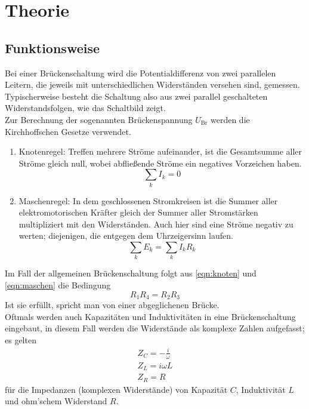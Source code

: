 \section{Theorie}
\label{sec:Theorie}

\subsection{Funktionsweise}
    Bei einer Brückenschaltung wird die Potentialdifferenz von zwei 
    parallelen Leitern, die jeweils mit unterschiedlichen Widerständen 
    versehen sind, gemessen.\\
    Typischerweise besteht die Schaltung also aus zwei parallel geschalteten 
    Widerstandsfolgen, wie das Schaltbild %
    zeigt.\\

    \noindent Zur Berechnung der sogenannten Brückenspannung $U_{\text{Br}}$
    werden die Kirchhoffschen Gesetze verwendet.\\
    \begin{enumerate}
        \item Knotenregel: Treffen mehrere Ströme aufeinander, ist die Gesamtsumme
        aller Ströme gleich null, wobei abfließende Ströme ein negatives Vorzeichen
        haben.\\
        \begin{equation}
            \sum_k I_k = 0
            \label{eqn:knoten}
        \end{equation}
        \item Maschenregel: In dem geschlossenen Stromkreisen ist die Summer
        aller elektromotorischen Kräfter gleich der Summer aller Stromstärken 
        multipliziert mit den Widerständen. Auch hier sind eine Ströme negativ 
        zu werten; diejenigen, die entgegen dem Uhrzeigersinn laufen.\\
        \begin{equation}
            \sum_k E_k = \sum_k I_k R_k
            \label{eqn:maschen}
        \end{equation}
    \end{enumerate}

    \noindent Im Fall der allgemeinen Brückenschaltung folgt aus \eqref{eqn:knoten}
    und \eqref{eqn:maschen} die Bedingung 
    \begin{equation}
        R_1 R_4 = R_2 R_3
        \label{eqn:abgleich}
    \end{equation}
    Ist sie erfüllt, spricht man von einer abgeglichenen Brücke. \\
    Oftmals werden auch Kapazitäten und Induktivitäten in eine Brückenschaltung eingebaut,
    in diesem Fall werden die Widerstände als komplexe Zahlen aufgefasst; es gelten
    \begin{align*}
        Z_C = - \frac{i}{\omega}\\
        Z_L = i \omega L\\
        Z_R = R
    \end{align*}
    für die Impedanzen (komplexen Widerstände) von Kapazität $C$, Induktivität $L$ und ohm'schem
    Widerstand $R$.

